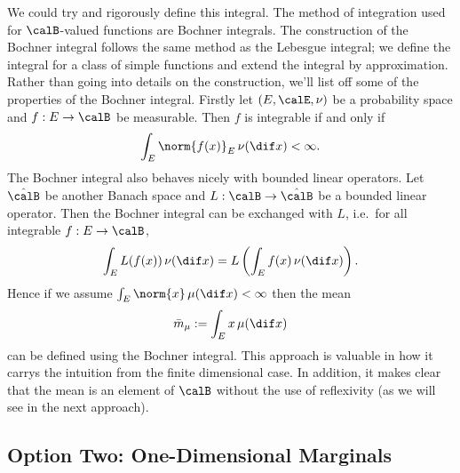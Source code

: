 \documentclass[fontsize=12pt, DIV=10]{scrreprt}
\theoremstyle{mydefn}
\theoremstyle{remark}
\newcommand{\defeq}{:=}
\begin{document}
We could try and rigorously define this integral. The method of integration used for $\calB$-valued functions are Bochner integrals. The construction of the Bochner integral follows the same method as the Lebesgue integral; we define the integral for a class of simple functions and extend the integral by approximation. Rather than going into details on the construction, we'll list off some of the properties of the Bochner integral. Firstly let $(E, \calE, \nu)$ be a probability space and $f: E \to \calB$ be measurable. Then $f$ is integrable if and only if
\begin{equation}
	\int_E \norm{f(x)}_E \, \nu(\dif x) < \infty.
\end{equation}
The Bochner integral also behaves nicely with bounded linear operators. Let $\hat{\calB}$ be another Banach space and $L: \calB \to \hat{\calB}$ be a bounded linear operator. Then the Bochner integral can be exchanged with $L$, i.e.\ for all integrable $f: E \to \calB$,
\begin{equation}
	\int_E L(f(x)) \, \nu(\dif x) = L\left( \int_E f(x) \, \nu(\dif x)\right).
\end{equation}
Hence if we assume $\int_E \norm{x} \, \mu(\dif x) < \infty$ then the mean
\begin{equation}
	\bar{m}_{\mu} \defeq \int_E x \, \mu(\dif x)
\end{equation}
can be defined using the Bochner integral. This approach is valuable in how it carrys the intuition from the finite dimensional case. In addition, it makes clear that the mean is an element of $\calB$ without the use of reflexivity (as we will see in the next approach). 

\subsection{Option Two: One-Dimensional Marginals}
\end{document}
